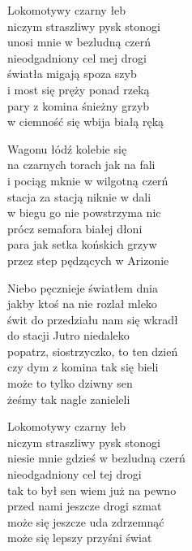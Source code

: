 \begin{text}
    Lokomotywy czarny łeb\\
    niczym straszliwy pysk stonogi\\
    unosi mnie w bezludną czerń\\
    nieodgadniony cel mej drogi\\
    światła migają spoza szyb\\
    i most się pręży ponad rzeką\\
    pary z komina śnieżny grzyb\\
    w ciemność się wbija białą ręką

    Wagonu łódź kolebie się\\
    na czarnych torach jak na fali\\
    i pociąg mknie w wilgotną czerń\\
    stacja za stacją niknie w dali\\
    w biegu go nie powstrzyma nic\\
    prócz semafora białej dłoni\\
    para jak setka końskich grzyw\\
    przez step pędzących w Arizonie

    Niebo pęcznieje światłem dnia\\
    jakby ktoś na nie rozlał mleko\\
    świt do przedziału nam się wkradł\\
    do stacji Jutro niedaleko\\
    popatrz, siostrzyczko, to ten dzień\\
    czy dym z komina tak się bieli\\
    może to tylko dziwny sen\\
    żeśmy tak nagle zanieleli

    Lokomotywy czarny łeb\\
    niczym straszliwy pysk stonogi\\
    niesie mnie gdzieś w bezludną czerń\\
    nieodgadniony cel tej drogi\\
    tak to był sen wiem już na pewno\\
    przed nami jeszcze drogi szmat\\
    może się jeszcze uda zdrzemnąć\\
    może się lepszy przyśni świat
\end{text}
\begin{chord}

\end{chord}